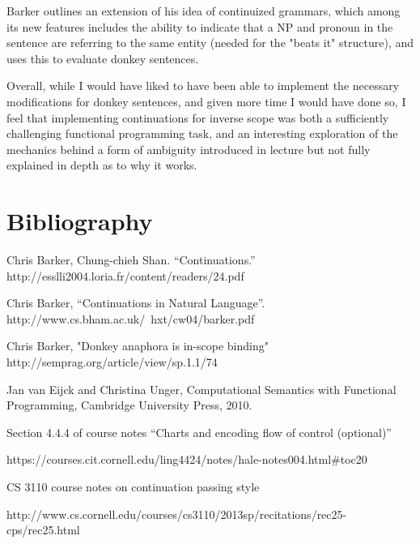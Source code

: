 \documentclass[11pt]{article} %
\begin{document}
Barker outlines an extension of his idea of continuized grammars, which among its new features includes the ability to indicate that a NP and pronoun in the sentence are referring to the same entity (needed for the "beats it" structure), and uses this to evaluate donkey sentences.

Overall, while I would have liked to have been able to implement the necessary modifications for donkey sentences, and given more time I would have done so, I feel that implementing continuations for inverse scope was both a sufficiently challenging functional programming task, and an interesting exploration of the mechanics behind a form of ambiguity introduced in lecture but not fully explained in depth as to why it works.

\section{Bibliography}

Chris Barker, Chung-chieh Shan. “Continuations.” http://esslli2004.loria.fr/content/readers/24.pdf
\bigskip

Chris Barker, “Continuations in Natural Language”. http://www.cs.bham.ac.uk/~hxt/cw04/barker.pdf
\bigskip

Chris Barker, "Donkey anaphora is in-scope binding" http://semprag.org/article/view/sp.1.1/74
\bigskip

Jan van Eijck and Christina Unger, Computational Semantics with Functional Programming, Cambridge University Press, 2010.
\bigskip

Section 4.4.4 of course notes “Charts and encoding flow of control (optional)” 

https://courses.cit.cornell.edu/ling4424/notes/hale-notes004.html$\#$toc20
\bigskip

CS 3110 course notes on continuation passing style

http://www.cs.cornell.edu/courses/cs3110/2013sp/recitations/rec25-cps/rec25.html
\end{document}

